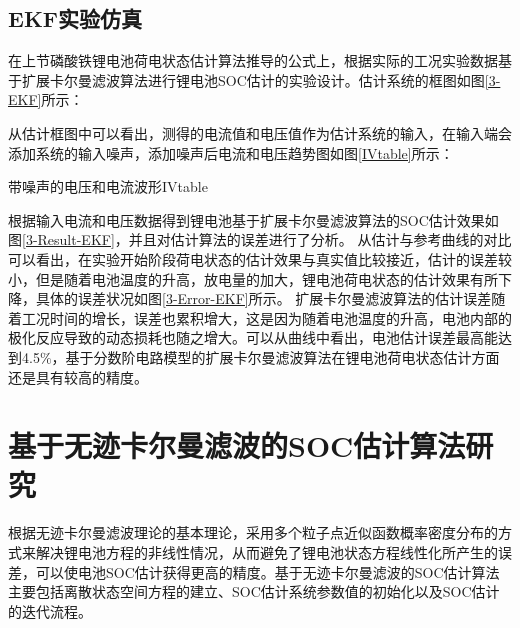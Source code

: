 \subsection{EKF实验仿真}
在上节磷酸铁锂电池荷电状态估计算法推导的公式上，根据实际的工况实验数据基于扩展卡尔曼滤波算法进行锂电池SOC估计的实验设计。估计系统的框图如图\ref{3-EKF}所示：

从估计框图中可以看出，测得的电流值和电压值作为估计系统的输入，在输入端会添加系统的输入噪声，添加噪声后电流和电压趋势图如图\ref{IVtable}所示：
\begin{pics}[htbp]{带噪声的电压和电流波形}{IVtable}
\end{pics}

根据输入电流和电压数据得到锂电池基于扩展卡尔曼滤波算法的SOC估计效果如图\ref{3-Result-EKF}，并且对估计算法的误差进行了分析。
从估计与参考曲线的对比可以看出，在实验开始阶段荷电状态的估计效果与真实值比较接近，估计的误差较小，但是随着电池温度的升高，放电量的加大，锂电池荷电状态的估计效果有所下降，具体的误差状况如图\ref{3-Error-EKF}所示。
扩展卡尔曼滤波算法的估计误差随着工况时间的增长，误差也累积增大，这是因为随着电池温度的升高，电池内部的极化反应导致的动态损耗也随之增大。可以从曲线中看出，电池估计误差最高能达到4.5$\% $，基于分数阶电路模型的扩展卡尔曼滤波算法在锂电池荷电状态估计方面还是具有较高的精度。
\section{基于无迹卡尔曼滤波的SOC估计算法研究}
根据无迹卡尔曼滤波理论的基本理论，采用多个粒子点近似函数概率密度分布的方式来解决锂电池方程的非线性情况，从而避免了锂电池状态方程线性化所产生的误差，可以使电池SOC估计获得更高的精度。基于无迹卡尔曼滤波的SOC估计算法主要包括离散状态空间方程的建立、SOC估计系统参数值的初始化以及SOC估计的迭代流程。
